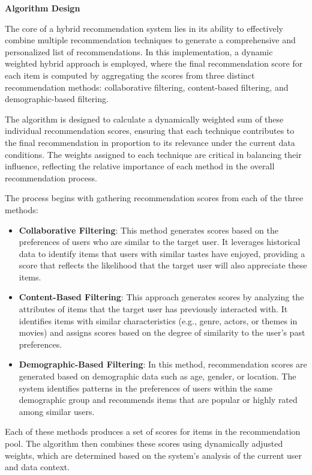 \documentclass{article}
\begin{document}
\textbf{Algorithm Design}

The core of a hybrid recommendation system lies in its ability to effectively combine multiple recommendation techniques to generate a comprehensive and personalized list of recommendations. In this implementation, a dynamic weighted hybrid approach is employed, where the final recommendation score for each item is computed by aggregating the scores from three distinct recommendation methods: collaborative filtering, content-based filtering, and demographic-based filtering.

The algorithm is designed to calculate a dynamically weighted sum of these individual recommendation scores, ensuring that each technique contributes to the final recommendation in proportion to its relevance under the current data conditions. The weights assigned to each technique are critical in balancing their influence, reflecting the relative importance of each method in the overall recommendation process.

The process begins with gathering recommendation scores from each of the three methods:

\begin{itemize}
    \item \textbf{Collaborative Filtering}: This method generates scores based on the preferences of users who are similar to the target user. It leverages historical data to identify items that users with similar tastes have enjoyed, providing a score that reflects the likelihood that the target user will also appreciate these items.
    \item \textbf{Content-Based Filtering}: This approach generates scores by analyzing the attributes of items that the target user has previously interacted with. It identifies items with similar characteristics (e.g., genre, actors, or themes in movies) and assigns scores based on the degree of similarity to the user's past preferences.
    \item \textbf{Demographic-Based Filtering}: In this method, recommendation scores are generated based on demographic data such as age, gender, or location. The system identifies patterns in the preferences of users within the same demographic group and recommends items that are popular or highly rated among similar users.
\end{itemize}

Each of these methods produces a set of scores for items in the recommendation pool. The algorithm then combines these scores using dynamically adjusted weights, which are determined based on the system's analysis of the current user and data context.
\end{document}
